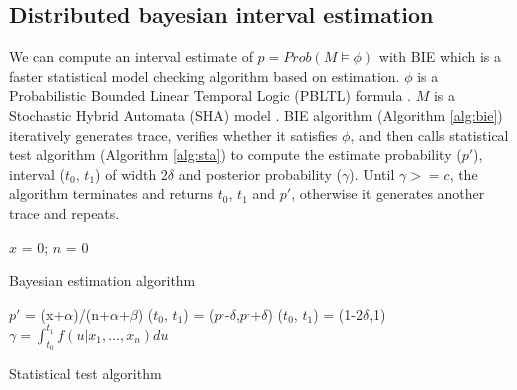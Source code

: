 \subsection{Distributed bayesian interval estimation}

We can compute an interval estimate of $p=Prob(M\models\phi)$ with BIE which is a faster statistical model checking algorithm based on estimation. $\phi$ is a Probabilistic Bounded Linear Temporal Logic (PBLTL) formula \cite{baier2008principles}. $M$ is a Stochastic Hybrid Automata (SHA) model \cite{David2014Statistical}. BIE algorithm (Algorithm \ref{alg:bie}) iteratively generates trace, verifies whether it satisfies $\phi$, and then calls statistical test algorithm (Algorithm \ref{alg:sta}) to compute the estimate probability ($p'$), interval ($t_0$, $t_1$) of width 2$\delta$ and posterior probability ($\gamma$). Until $\gamma >= c$, the algorithm terminates and returns $t_0$, $t_1$ and $p'$, otherwise it generates another trace and repeats.

\begin{algorithm}[t]
{}
$x$ = 0; $n$ = 0\;
\caption{Bayesian estimation algorithm}
\label{alg:bie}
\end{algorithm}


\begin{algorithm}[t]
{}
        $p'$ = (x+$\alpha$)/(n+$\alpha$+$\beta$)\;
        ($t_0$, $t_1$) = ($p^,$-$\delta$,$p^,$+$\delta$)\;
        {
           ($t_0$, $t_1$) = (1-2$\delta$,1)\;
         }{
          }
        $\gamma=\int_{t_0}^{t_1} {f(u|x_1,...,x_n)du}$\;
\caption{Statistical test algorithm}
\label{alg:sta}
\end{algorithm}

